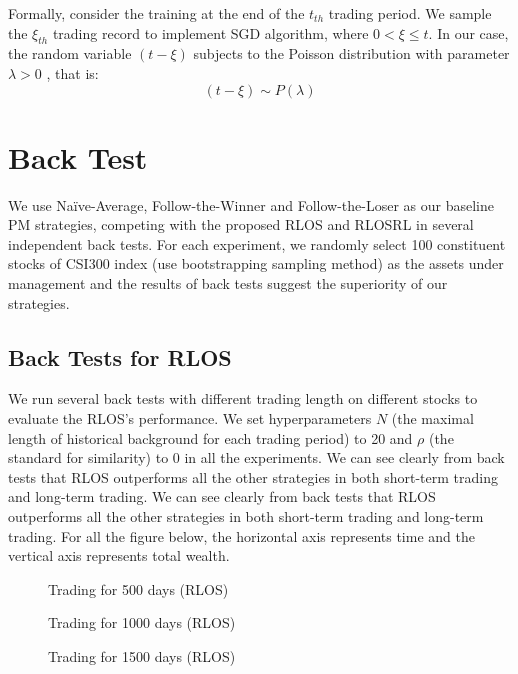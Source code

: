 \documentclass{gapd}
\begin{document}
Formally, consider the training at the end of the $t_{th}$ trading period. We sample the $\xi_{th}$ trading record to implement SGD algorithm, where $0<\xi\le t$. In our case, the random variable  $(t-\xi)$ subjects to the Poisson distribution with parameter $\lambda >0$ , that is:
$$(t-\xi)\sim P(\lambda)$$

\section{Back Test}

We use Naïve-Average, Follow-the-Winner and Follow-the-Loser as our baseline PM strategies, competing with the proposed RLOS and RLOSRL in several independent back tests. For each experiment, we randomly select 100 constituent stocks of CSI300 index (use bootstrapping sampling method) as the assets under management and the results of back tests suggest the superiority of our strategies.

\subsection{Back Tests for RLOS}

We run several back tests with different trading length on different stocks to evaluate the RLOS's performance. We set hyperparameters $N$ (the maximal length of historical background for each trading period) to 20 and $\rho$ (the standard for similarity) to 0 in all the experiments. We can see clearly from back tests that RLOS outperforms all the other strategies in both short-term trading and long-term trading. We can see clearly from back tests that RLOS outperforms all the other strategies in both short-term trading and long-term trading. For all the figure below, the horizontal axis represents time and the vertical axis represents total wealth.

\begin{figure}[H]
\centering
{}
\caption{Trading for 500 days (RLOS) }
\label{Fig.lable}
\end{figure}
\begin{figure}[H]
\centering
{}
\caption{Trading for 1000 days (RLOS) }
\label{Fig.lable}
\end{figure}
\begin{figure}[H]
\centering
{}
\caption{Trading for 1500 days (RLOS) }
\label{Fig.lable}
\end{figure}
\end{document}
